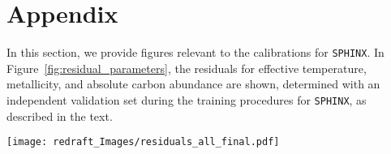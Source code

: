 \documentclass[twocolumn,trackchanges]{aastex63}
\begin{document}
\clearpage
%

\nocite{*}


\section{Appendix}

In this section, we provide figures relevant to the calibrations for \texttt{SPHINX}. In Figure~\ref{fig:residual_parameters}, the residuals for effective temperature, metallicity, and absolute carbon abundance are shown, determined with an independent validation set during the training procedures for \texttt{SPHINX}, as described in the text.

\begin{figure*}[h]
	\centering
	\texttt{[image: redraft\_Images/residuals\_all\_final.pdf]}
	
	\caption{Photometric estimates of effective temperature are shown in the left panels, with metallcity and absolute carbon abundance in the center and right panels, respectively. All results are produced by \texttt{SPHINX} using S-PLUS photometry. In the bottom panels, residuals are shown of effective temperature, metallicity, and absolute carbon abundance, as a function of the spectroscopic effective temperature estimate from the n-SSPP estimates of SEGUE and APOGEE  stars.
	\label{fig:residual_parameters}}
\end{figure*}



	
\end{document}
